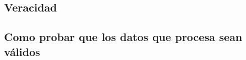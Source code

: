 \clearpage
\subsection{Veracidad}

\subsection{Como probar que los datos que procesa sean válidos}
\lipsum[1] %

\clearpage
 